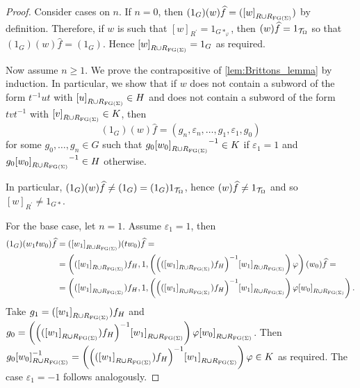 \begin{proof}
  Consider cases on $n$. If $n = 0$, then $(1_G)(w)\widehat{f} = ({[w]}_{R\cup R_{\textrm{FG}(\Sigma)}})$ by definition.
  Therefore, if $w$ is such that ${[w]}_{R^\prime} = 1_{G\ast_\varphi}$, then $(w)\widehat{f} =
  1_{\mathcal{T}_\Omega}$ so that $(1_G)(w)\widehat{f} = (1_G)$. Hence ${[w]}_{R\cup R_{\textrm{FG}(\Sigma)}} = 1_G$ as required.

  Now assume $n\geq 1$. We prove the contrapositive of \cref{lem:Brittons_lemma} by induction. In
  particular, we show that if $w$ does not contain a subword of the form $t^{-1}ut$ with
  ${[u]}_{R\cup R_{\textrm{FG}(\Sigma)}} \in H$ and does not contain a subword
  of the form $tvt^{-1}$ with ${[v]}_{R\cup R_{\textrm{FG}(\Sigma)}} \in K$, then
  \[
    (1_G)(w)\widehat{f} = (g_n, \varepsilon_n, \ldots, g_1, \varepsilon_1, g_0)
  \]
  for some $g_0,\ldots, g_n \in G$
  such that $g_0{{[w_0]}_{R\cup R_{\textrm{FG}(\Sigma)}}}^{-1}\in K$ if $\varepsilon_1 = 1$ and
  $g_0 {{[w_0]}_{R\cup R_{\textrm{FG}(\Sigma)}}}^{-1}\in H$ otherwise.

  In particular, $(1_G)(w)\widehat{f} \neq (1_G) = (1_G)1_{\mathcal{T}_\Omega}$, hence $(w)\widehat{f}
  \neq 1_{\mathcal{T}_\Omega}$ and so ${[w]}_{R^\prime} \neq 1_{G\ast}$.

  For the base case, let $n = 1$. Assume $\varepsilon_1 = 1$, then
  \begin{align*}
    (1_G)(w_1t w_0)\widehat{f} &= ({[w_1]}_{R\cup R_{\textrm{FG}(\Sigma)}})(t w_0)\widehat{f} = \\
    &= \left(({[w_1]}_{R\cup R_{\textrm{FG}(\Sigma)}})f_H,1,
      \left({\left(({[w_1]}_{R\cup R_{\textrm{FG}(\Sigma)}})f_H\right)}^{-1}
    {[w_1]}_{R\cup R_{\textrm{FG}(\Sigma)}}\right)\varphi\right)(w_0)\widehat{f} = \\
    &= \left(({[w_1]}_{R\cup R_{\textrm{FG}(\Sigma)}})f_H,1,\left({\left(({[w_1]}_{R\cup R_{\textrm{FG}(\Sigma)}})f_H\right)}^{-1}
    {[w_1]}_{R\cup R_{\textrm{FG}(\Sigma)}}\right)\varphi {[w_0]}_{R\cup R_{\textrm{FG}(\Sigma)}}\right).
  \end{align*}
  Take $g_1 = ({[w_1]}_{R\cup R_{\textrm{FG}(\Sigma)}})f_H$ and
  $g_0 = \left({\left(({[w_1]}_{R\cup R_{\textrm{FG}(\Sigma)}})f_H\right)}^{-1}
  {[w_1]}_{R\cup R_{\textrm{FG}(\Sigma)}}\right)\varphi {[w_0]}_{R\cup R_{\textrm{FG}(\Sigma)}}$. Then
  $g_0{[w_0]}^{-1}_{R\cup R_{\textrm{FG}(\Sigma)}} = \left({\left(({[w_1]}_{R\cup R_{\textrm{FG}(\Sigma)}})f_H\right)}^{-1}
  {[w_1]}_{R\cup R_{\textrm{FG}(\Sigma)}}\right)\varphi \in K$ as required.
  The case $\varepsilon_1 = -1$ follows analogously.


\end{proof}
